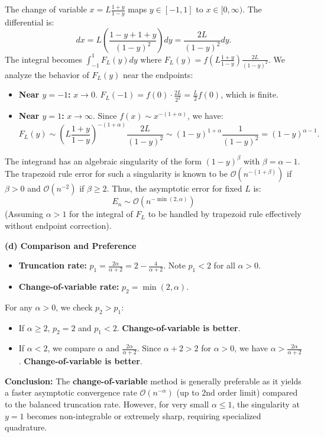 \begin{solution}
The change of variable $x = L \frac{1+y}{1-y}$ maps $y \in [-1, 1]$ to $x \in [0, \infty)$. The differential is:
\[ dx = L \left( \frac{1-y + 1+y}{(1-y)^2} \right) dy = \frac{2L}{(1-y)^2} dy. \]
The integral becomes $\int_{-1}^1 F_L(y) dy$ where $F_L(y) = f\left( L \frac{1+y}{1-y} \right) \frac{2L}{(1-y)^2}$.
We analyze the behavior of $F_L(y)$ near the endpoints:
\begin{itemize}
    \item \textbf{Near $y = -1$:} $x \to 0$. $F_L(-1) = f(0) \cdot \frac{2L}{2^2} = \frac{L}{2} f(0)$, which is finite.
    \item \textbf{Near $y = 1$:} $x \to \infty$. Since $f(x) \sim x^{-(1+\alpha)}$, we have:
    \[ F_L(y) \sim \left( L \frac{1+y}{1-y} \right)^{-(1+\alpha)} \frac{2L}{(1-y)^2} \sim (1-y)^{1+\alpha} \frac{1}{(1-y)^2} = (1-y)^{\alpha-1}. \]
\end{itemize}
The integrand has an algebraic singularity of the form $(1-y)^\beta$ with $\beta = \alpha-1$. The trapezoid rule error for such a singularity is known to be $\mathcal{O}(n^{-(1+\beta)})$ if $\beta > 0$ and $\mathcal{O}(n^{-2})$ if $\beta \geq 2$.
Thus, the asymptotic error for fixed $L$ is:
\[ \boxed{E_n \sim \mathcal{O}(n^{-\min(2, \alpha)})} \]
(Assuming $\alpha > 1$ for the integral of $F_L$ to be handled by trapezoid rule effectively without endpoint correction).

\textbf{(d) Comparison and Preference}

\begin{itemize}
    \item \textbf{Truncation rate:} $p_1 = \frac{2\alpha}{\alpha+2} = 2 - \frac{4}{\alpha+2}$. Note $p_1 < 2$ for all $\alpha > 0$.
    \item \textbf{Change-of-variable rate:} $p_2 = \min(2, \alpha)$.
\end{itemize}
For any $\alpha > 0$, we check $p_2 > p_1$:
\begin{itemize}
    \item If $\alpha \geq 2$, $p_2 = 2$ and $p_1 < 2$. \textbf{Change-of-variable is better}.
    \item If $\alpha < 2$, we compare $\alpha$ and $\frac{2\alpha}{\alpha+2}$. Since $\alpha+2 > 2$ for $\alpha > 0$, we have $\alpha > \frac{2\alpha}{\alpha+2}$. \textbf{Change-of-variable is better}.
\end{itemize}
\textbf{Conclusion:} The \textbf{change-of-variable} method is generally preferable as it yields a faster asymptotic convergence rate $\mathcal{O}(n^{-\alpha})$ (up to 2nd order limit) compared to the balanced truncation rate. However, for very small $\alpha \leq 1$, the singularity at $y=1$ becomes non-integrable or extremely sharp, requiring specialized quadrature.
\end{solution}


